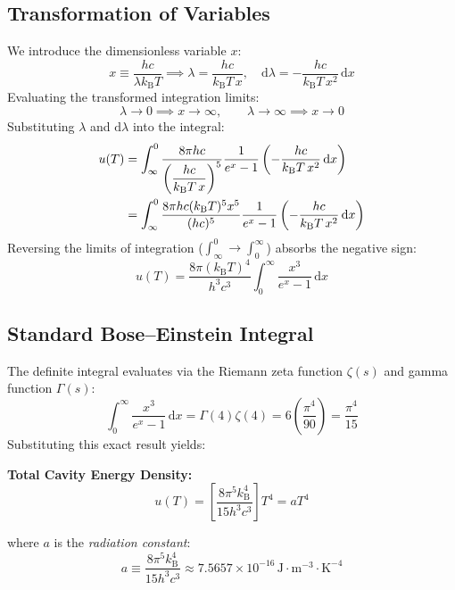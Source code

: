 \documentclass[11pt,a4paper]{article}
\newcommand{\diff}{\mathrm{d}}
\newcommand{\kB}{k_{\mathrm{B}}}
\begin{document}
\subsection{Transformation of Variables}
We introduce the dimensionless variable $x$:
\begin{equation}
    x \equiv \frac{hc}{\lambda \kB T} \implies \lambda = \frac{hc}{\kB T \, x}, \quad 
    \diff\lambda = -\frac{hc}{\kB T \, x^2} \,\diff x
\end{equation}
Evaluating the transformed integration limits:
\begin{equation}
    \lambda \to 0 \implies x \to \infty, \qquad \lambda \to \infty \implies x \to 0
\end{equation}
Substituting $\lambda$ and $\diff\lambda$ into the integral:
\begin{align}
    u(T) &= \int_{\infty}^{0} \frac{8\pi hc}{\left( \dfrac{hc}{\kB T \, x} \right)^5} \frac{1}{e^x - 1} \left( -\frac{hc}{\kB T \, x^2} \,\diff x \right) \notag \\
    &= \int_{\infty}^{0} \frac{8\pi hc (\kB T)^5 x^5}{(hc)^5} \frac{1}{e^x - 1} \left( -\frac{hc}{\kB T \, x^2} \,\diff x \right)
\end{align}
Reversing the limits of integration ($\int_{\infty}^0 \to \int_0^\infty$) absorbs the negative sign:
\begin{equation}
    u(T) = \frac{8\pi (\kB T)^4}{h^3 c^3} \int_{0}^{\infty} \frac{x^3}{e^x - 1} \,\diff x
\end{equation}

\subsection{Standard Bose--Einstein Integral}
The definite integral evaluates via the Riemann zeta function $\zeta(s)$ and gamma function $\Gamma(s)$:
\begin{equation}
    \int_{0}^{\infty} \frac{x^3}{e^x - 1} \,\diff x = \Gamma(4) \zeta(4) = 6 \left( \frac{\pi^4}{90} \right) = \frac{\pi^4}{15}
\end{equation}
Substituting this exact result yields:

\begin{resultbox}
\textbf{Total Cavity Energy Density:}
\begin{equation}
    \boxed{u(T) = \left[ \frac{8\pi^5 \kB^4}{15 h^3 c^3} \right] T^4 = a T^4} \tag{IX}
\end{equation}
\end{resultbox}
where $a$ is the \textit{radiation constant}:
\begin{equation}
    a \equiv \frac{8\pi^5 \kB^4}{15 h^3 c^3} \approx 7.5657 \times 10^{-16} \,\mathrm{J}\cdot\mathrm{m}^{-3}\cdot\mathrm{K}^{-4}
\end{equation}
\end{document}
